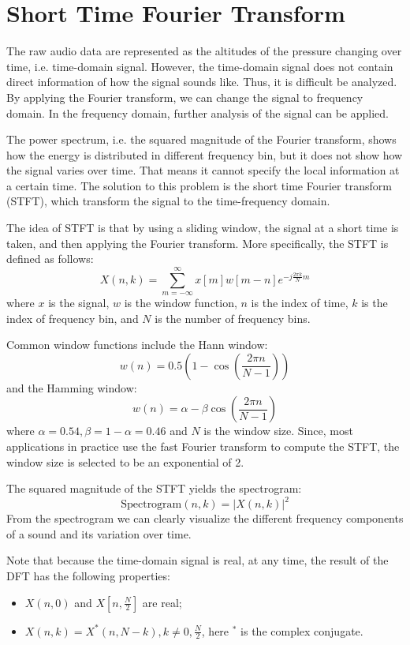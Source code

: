 \documentclass[12pt,final,twoside]{report}
\begin{document}
\section{Short Time Fourier Transform}
The raw audio data are represented as the altitudes of the pressure changing over time, i.e. time-domain signal. However, the time-domain signal does not contain direct information of how the signal sounds like. Thus, it is difficult be analyzed. By applying the Fourier transform, we can change the signal to frequency domain. In the frequency domain, further analysis of the signal can be applied.

The power spectrum, i.e. the squared magnitude of the Fourier transform, shows how the energy is distributed in different frequency bin, but it does not show how the signal varies over time. That means it cannot specify the local information at a certain time. The solution to this problem is the short time Fourier transform (STFT), which transform the signal to the time-frequency domain.

The idea of STFT is that by using a sliding window, the signal at a short time is taken, and then applying the Fourier transform. More specifically, the STFT is defined as follows:
\begin{equation}
  X(n, k) = \sum_{m = -\infty}^{\infty} x[m]w[m-n]e^{-j \frac{2\pi k}{N} m}
\end{equation}
where $x$ is the signal, $w$ is the window function, $n$ is the index of time, $k$ is the index of frequency bin, and $N$ is the number of frequency bins. 

Common window functions include the Hann window:
\begin{equation} w(n) = 0.5 (1 - \cos(\frac{2\pi n}{N-1})) \end{equation}
and the Hamming window:
\begin{equation} w(n) = \alpha - \beta \cos(\frac{2\pi n}{N-1}) \end{equation}
where $\alpha = 0.54, \beta = 1 - \alpha = 0.46$ and $N$ is the window size.
Since, most applications in practice use the fast Fourier transform to compute the STFT, the window size is selected to be an exponential of 2.

The squared magnitude of the STFT yields the spectrogram:
\[ \text{Spectrogram}(n, k) = \left|X(n,k)\right|^2 \]
From the spectrogram we can clearly visualize the different frequency components of a sound and its variation over time.

Note that because the time-domain signal is real, at any time, the result of the DFT has the following properties:
\begin{itemize}
  \item $X(n,0)$ and $X[n, \frac{N}{2}]$ are real;
  \item $X(n,k) = X^*(n,N-k), k \neq 0, \frac{N}{2}$, here $^*$ is the complex conjugate.
\end{itemize}
\end{document}
